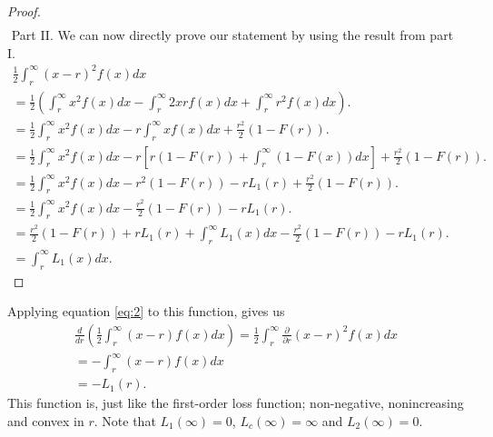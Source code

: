 \documentclass{article}
\begin{document}
\begin{flushleft}
\begin{proof}
\begin{equation*}
\begin{gathered}
            \end{gathered}
        \end{equation*}
        $ $\newline
        Part II.
        We can now directly prove our statement by using the result from part I.
        \begin{equation*}
            \begin{gathered}
                \frac{1}{2}\int_{r}^{\infty} (x-r)^2f(x)dx \\
                = \frac{1}{2}\left(\int_{r}^{\infty}x^2f(x)dx - \int_{r}^{\infty}2xrf(x)dx + \int_{r}^{\infty}r^2f(x)dx\right). \\
                = \frac{1}{2}\int_{r}^{\infty}x^2f(x)dx - r\int_{r}^{\infty}xf(x)dx + \frac{r^2}{2}(1-F(r)). \\
                = \frac{1}{2}\int_{r}^{\infty}x^2f(x)dx - r\left[r(1-F(r))+\int_{r}^{\infty}(1-F(x))dx\right] + \frac{r^2}{2}(1-F(r)). \\
                = \frac{1}{2}\int_{r}^{\infty}x^2f(x)dx - r^2(1-F(r))-rL_1(r)+ \frac{r^2}{2}(1-F(r)). \\
                = \frac{1}{2}\int_{r}^{\infty}x^2f(x)dx - \frac{r^2}{2}(1-F(r))-rL_1(r). \\
                = \frac{r^2}{2}(1-F(r))+rL_1(r) + \int_{r}^{\infty}L_1(x)dx- \frac{r^2}{2}(1-F(r))-rL_1(r). \\
                = \int_{r}^{\infty}L_1(x)dx.
            \end{gathered}
        \end{equation*}
    \end{proof}
    Applying equation \ref{eq:2} to this function, gives us
    \begin{equation}
        \begin{gathered}
            \frac{d}{dr}\left(\frac{1}{2}\int_{r}^{\infty} (x-r)f(x)dx\right)  = \frac{1}{2}\int_{r}^{\infty}\frac{\partial}{\partial r} (x-r)^2f(x)dx \\
            = -\int_{r}^{\infty}(x-r)f(x)dx                                                                                         \\
            = -L_1(r).
        \end{gathered}
    \end{equation}
    This function is, just like the first-order loss function; non-negative, nonincreasing and convex in $r$.
    Note that $L_1(\infty) = 0$, $L_c(\infty) = \infty$ and $L_2(\infty) = 0$.
\end{flushleft}
\end{document}
